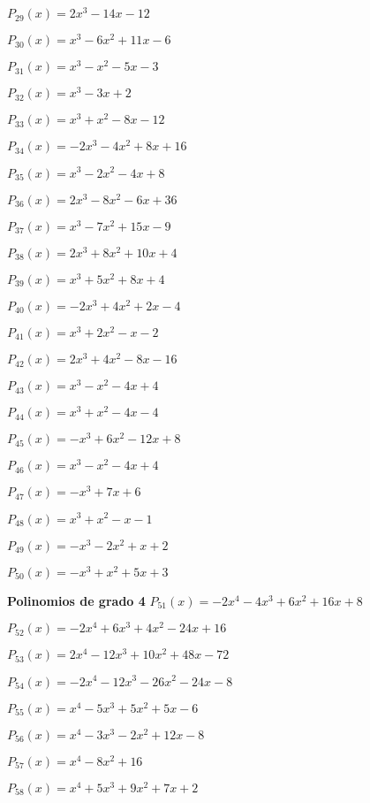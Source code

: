 \subitem $P_{29}(x) = 2x^3 - 14x - 12$

\subitem $P_{30}(x) = x^3 - 6x^2 + 11x - 6$

\subitem $P_{31}(x) = x^3 - x^2 - 5x - 3$

\subitem $P_{32}(x) = x^3 - 3x + 2$

\subitem $P_{33}(x) = x^3 + x^2 - 8x - 12$

\subitem $P_{34}(x) = -2x^3 - 4x^2 + 8x + 16$

\subitem $P_{35}(x) = x^3 - 2x^2 - 4x + 8$

\subitem $P_{36}(x) = 2x^3 - 8x^2 - 6x + 36$

\subitem $P_{37}(x) = x^3 - 7x^2 + 15x - 9$

\subitem $P_{38}(x) = 2x^3 + 8x^2 + 10x + 4$

\subitem $P_{39}(x) = x^3 + 5x^2 + 8x + 4$

\subitem $P_{40}(x) = -2x^3 + 4x^2 + 2x - 4$

\subitem $P_{41}(x) = x^3 + 2x^2 - x - 2$

\subitem $P_{42}(x) = 2x^3 + 4x^2 - 8x - 16$

\subitem $P_{43}(x) = x^3 - x^2 - 4x + 4$

\subitem $P_{44}(x) = x^3 + x^2 - 4x - 4$

\subitem $P_{45}(x) = -x^3 + 6x^2 - 12x + 8$

\subitem $P_{46}(x) = x^3 - x^2 - 4x + 4$

\subitem $P_{47}(x) = -x^3 + 7x + 6$

\subitem $P_{48}(x) = x^3 + x^2 - x - 1$

\subitem $P_{49}(x) = -x^3 - 2x^2 + x + 2$

\subitem $P_{50}(x) = -x^3 + x^2 + 5x + 3$

\textbf{Polinomios de grado 4} 
\subitem $P_{51}(x) = -2x^4 - 4x^3 + 6x^2 + 16x + 8$

\subitem $P_{52}(x) = -2x^4 + 6x^3 + 4x^2 - 24x + 16$

\subitem $P_{53}(x) = 2x^4 - 12x^3 + 10x^2 + 48x - 72$

\subitem $P_{54}(x) = -2x^4 - 12x^3 - 26x^2 - 24x - 8$

\subitem $P_{55}(x) = x^4 - 5x^3 + 5x^2 + 5x - 6$

\subitem $P_{56}(x) = x^4 - 3x^3 - 2x^2 + 12x - 8$

\subitem $P_{57}(x) = x^4 - 8x^2 + 16$

\subitem $P_{58}(x) = x^4 + 5x^3 + 9x^2 + 7x + 2$

